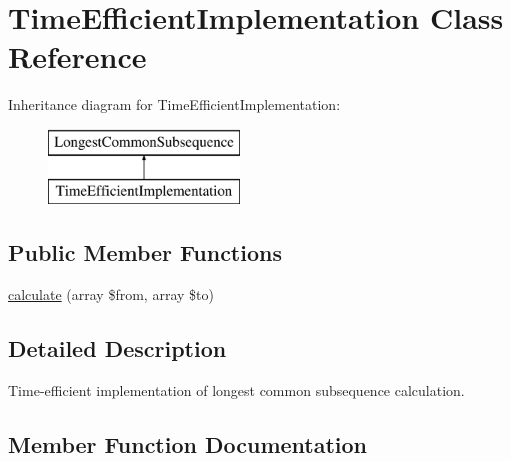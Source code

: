 \hypertarget{class_sebastian_bergmann_1_1_diff_1_1_l_c_s_1_1_time_efficient_implementation}{}\section{Time\+Efficient\+Implementation Class Reference}
\label{class_sebastian_bergmann_1_1_diff_1_1_l_c_s_1_1_time_efficient_implementation}
Inheritance diagram for Time\+Efficient\+Implementation\+:\begin{figure}[H]
\begin{center}
\leavevmode
\includegraphics[height=2.000000cm]{class_sebastian_bergmann_1_1_diff_1_1_l_c_s_1_1_time_efficient_implementation}
\end{center}
\end{figure}
\subsection*{Public Member Functions}
\begin{DoxyCompactItemize}
\item 
\mbox{\hyperlink{class_sebastian_bergmann_1_1_diff_1_1_l_c_s_1_1_time_efficient_implementation_a008d2ee23b87fa34470482270c5918a3}{calculate}} (array \$from, array \$to)
\end{DoxyCompactItemize}


\subsection{Detailed Description}
Time-\/efficient implementation of longest common subsequence calculation. 

\subsection{Member Function Documentation}
\mbox{\label{class_sebastian_bergmann_1_1_diff_1_1_l_c_s_1_1_time_efficient_implementation_a008d2ee23b87fa34470482270c5918a3}} 
